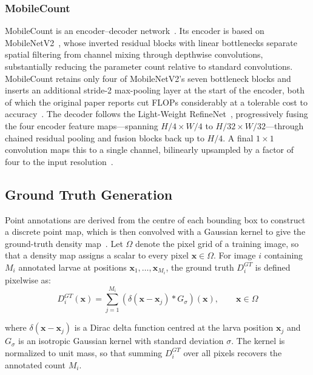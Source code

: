 \documentclass[conference]{IEEEtran}
\begin{document}
\subsubsection{MobileCount}
MobileCount is an encoder--decoder network~\cite{wang2020mobilecount}. Its encoder is based on MobileNetV2~\cite{sandler2018mobilenetv2}, whose inverted residual blocks with linear bottlenecks separate spatial filtering from channel mixing through depthwise convolutions, substantially reducing the parameter count relative to standard convolutions. MobileCount retains only four of MobileNetV2's seven bottleneck blocks and inserts an additional stride-2 max-pooling layer at the start of the encoder, both of which the original paper reports cut FLOPs considerably at a tolerable cost to accuracy~\cite{wang2020mobilecount}. The decoder follows the Light-Weight RefineNet~\cite{nekrasov2018lightweight}, progressively fusing the four encoder feature maps---spanning $H/4 \times W/4$ to $H/32 \times W/32$---through chained residual pooling and fusion blocks back up to $H/4$. A final $1 \times 1$ convolution maps this to a single channel, bilinearly upsampled by a factor of four to the input resolution~\cite{wang2020mobilecount}.

\subsection{Ground Truth Generation}

Point annotations are derived from the centre of each bounding box to construct a discrete point map, which is then convolved with a Gaussian kernel to give the ground-truth density map~\cite{lempitsky2010learning, Zhang_2016_CVPR}. Let $\Omega$ denote the pixel grid of a training image, so that a density map assigns a scalar to every pixel $\mathbf{x} \in \Omega$. For image $i$ containing $M_i$ annotated larvae at positions $\mathbf{x}_1, \dots, \mathbf{x}_{M_i}$, the ground truth $D_i^{GT}$ is defined pixelwise as:
\begin{equation}
  \label{eq:density-map}
  D_i^{GT}(\mathbf{x}) = \sum_{j=1}^{M_i} \left( \delta(\mathbf{x} - \mathbf{x}_j) * G_{\sigma} \right)(\mathbf{x}),
  \qquad \mathbf{x} \in \Omega
\end{equation}

where $\delta(\mathbf{x} - \mathbf{x}_j)$ is a Dirac delta function centred at the larva position $\mathbf{x}_j$ and $G_{\sigma}$ is an isotropic Gaussian kernel with standard deviation $\sigma$. The kernel is normalized to unit mass, so that summing $D_i^{GT}$ over all pixels recovers the annotated count $M_i$.
\end{document}
